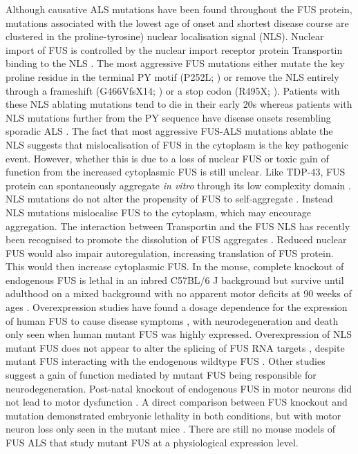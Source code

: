 Although causative ALS mutations have been found throughout the FUS protein, mutations associated with the lowest age of onset and shortest disease course are clustered in the proline-tyrosine) nuclear localisation signal (NLS). 
Nuclear import of FUS is controlled by the nuclear import receptor protein Transportin binding to the NLS \citep{Dormann2010}.
The most aggressive FUS mutations either mutate the key proline residue in the terminal PY motif (P252L; \citep{Chio2009}) or remove the NLS entirely through a frameshift (G466VfsX14; \citep{DeJesus-Hernandez2010}) or a stop codon (R495X; \citep{Bosco2010}). 
Patients with these NLS ablating mutations tend to die in their early 20s whereas patients with NLS mutations further from the PY sequence have disease onsets resembling sporadic ALS \citep{Shang2016}.
The fact that most aggressive FUS-ALS mutations ablate the NLS suggests that mislocalisation of FUS in the cytoplasm is the key pathogenic event. However, whether this is due to a loss of nuclear FUS or toxic gain of function from the increased cytoplasmic FUS is still unclear.
Like TDP-43, FUS protein can spontaneously aggregate \textit{in vitro} through its low complexity domain \citep{Murray2017}. 
NLS mutations do not alter the propensity of FUS to self-aggregate \citep{Sun2011}.
Instead NLS mutations mislocalise FUS to the cytoplasm, which may encourage aggregation. The interaction between Transportin and the FUS NLS has recently been recognised to promote the dissolution of FUS aggregates \citep{Guo2018, Yoshizawa2018}. 
Reduced nuclear FUS would also impair autoregulation, increasing translation of FUS protein. This would then increase cytoplasmic FUS.
In the mouse, complete knockout of endogenous FUS is lethal in an inbred C57BL/6 J background  \citep{Hicks2000, Kuroda2000} but survive until adulthood on a mixed background with no apparent motor deficits at 90 weeks of ages \citep{Kino2015}.
Overexpression studies have found a dosage dependence for the expression of human FUS to cause disease symptoms \citep{Verbeeck2012,Mitchell2013, Shiihashi2016}, with neurodegeneration and death only seen when human mutant FUS was highly expressed.
Overexpression of NLS mutant FUS does not appear to alter the splicing of FUS RNA targets \citep{Shiihashi2016}, despite mutant FUS interacting with the endogenous wildtype FUS \citep{Qiu2014}.
Other studies suggest a gain of function mediated by mutant FUS being responsible for neurodegeneration. 
Post-natal knockout of endogenous FUS  in motor neurons did not lead to motor dysfunction \citep{Sharma2016}.
A direct comparison between FUS knockout and mutation demonstrated embryonic lethality in both conditions, but with motor neuron loss only seen in the mutant mice \citep{Scekic-zahirovic2016}.  
There are still no mouse models of FUS ALS that study mutant FUS at a physiological expression level.



